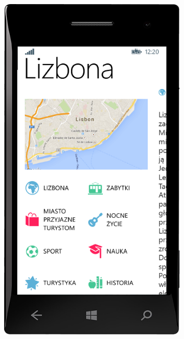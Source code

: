 \documentclass[a4paper]{book}
\begin{document}
		\begin{figure}[H]
			\ContinuedFloat
			
			\begin{subfigure}{0.3\textwidth}
				\includegraphics[width=\textwidth]{screenshots/mobile/mobile7.png}	
				\caption{\label{subfig:mobile_guidedetail}}
			\end{subfigure}
			\hfill

\end{figure}
\end{document}
